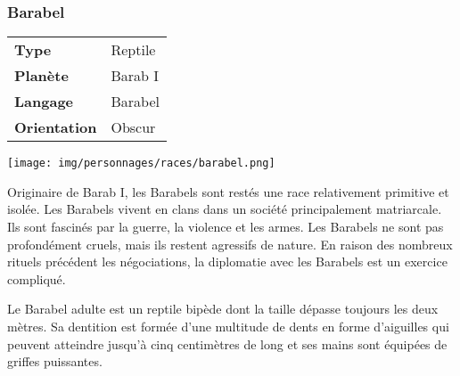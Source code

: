 \subsubsection{Barabel}
\begin{samepage}
	\begin{flushright}
		\begin{tabular}{ l l }
			\textbf{Type} 			& Reptile \\
		   	\textbf{Planète} 		& Barab I \\
		   	\textbf{Langage} 		& Barabel \\
		   	\textbf{Orientation} 	& Obscur \\
		\end{tabular}
	\end{flushright}

	\vspace{-5\baselineskip}
	\texttt{[image: img/personnages/races/barabel.png]}
\end{samepage}

Originaire de Barab I, les Barabels sont restés une race relativement primitive et isolée. Les Barabels vivent en clans dans un société principalement matriarcale. Ils sont fascinés par la guerre, la violence et les armes. Les Barabels ne sont pas profondément cruels, mais ils restent agressifs de nature. En raison des nombreux rituels précédent les négociations, la diplomatie avec les Barabels est un exercice compliqué.

Le Barabel adulte est un reptile bipède dont la taille dépasse toujours les deux mètres. Sa dentition est formée d’une multitude de dents en forme d’aiguilles qui peuvent atteindre jusqu’à cinq centimètres de long et ses mains sont équipées de griffes puissantes.

